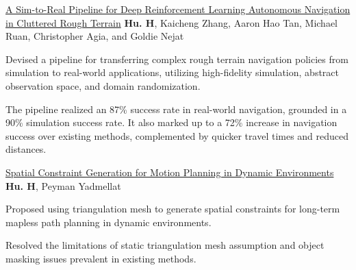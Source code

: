 


\begin{cventries}
  \cvpublicationentrysimple
    {\href{https://ieeexplore.ieee.org/document/9468918}{A Sim-to-Real Pipeline for Deep Reinforcement Learning Autonomous Navigation in Cluttered Rough Terrain}} %
    {\textbf{Hu. H}, Kaicheng Zhang, Aaron Hao Tan, Michael Ruan, Christopher Agia, and Goldie Nejat \hspace*{0pt}\hfill {}} %
    {
    \begin{cvitems}
      \item{Devised a pipeline for transferring complex rough terrain navigation policies from simulation to real-world applications, utilizing high-fidelity simulation, abstract observation space, and domain randomization.
      }
      \item{
        The pipeline realized an 87\% success rate in real-world navigation, grounded in a 90\% simulation success rate. It also marked up to a 72\% increase in navigation success over existing methods, complemented by quicker travel times and reduced distances.
      }
    \end{cvitems}
    }
  \cvpublicationentrysimple
    {\href{https://arxiv.org/abs/2110.14786}{Spatial Constraint Generation for Motion Planning in Dynamic Environments}} %
    {\textbf{Hu. H}, Peyman Yadmellat \hspace*{0pt}\hfill {}} %
    {
    \begin{cvitems}
      \item {Proposed using triangulation mesh to generate spatial constraints for long-term mapless path planning in dynamic environments.}
      \item {Resolved the limitations of static triangulation mesh assumption and object masking issues prevalent in existing methods.
}
\end{cvitems}}
\end{cventries}
